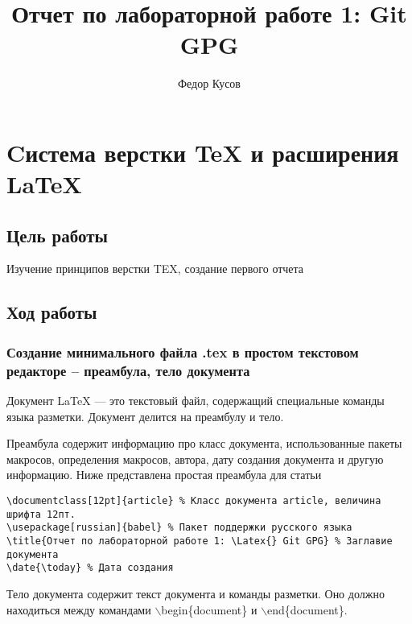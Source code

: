\documentclass[12pt,a4paper]{article}
\author{Федор Кусов}
\title{Отчет по лабораторной работе 1: \Latex{} Git GPG}
\begin{document}
\section{Cистема верстки \TeX{} и расширения \LaTeX{}}
\subsection{Цель работы}
Изучение принципов верстки TEX, создание первого отчета
\subsection{Ход работы}
\subsubsection{Создание минимального файла .tex в простом текстовом редакторе – преамбула, тело документа}


Документ LaTeX — это текстовый файл, содержащий специальные команды языка разметки. Документ делится на преамбулу и тело.

Преамбула содержит информацию про класс документа, использованные пакеты макросов, определения макросов, автора, дату создания документа и другую информацию. Ниже представлена простая преамбула для статьи
\begin{Verbatim}[xleftmargin=.5in,fontsize=\small]
\documentclass[12pt]{article} % Класс документа article, величина шрифта 12пт.
\usepackage[russian]{babel} % Пакет поддержки русского языка
\title{Отчет по лабораторной работе 1: \Latex{} Git GPG} % Заглавие документа
\date{\today} % Дата создания
\end{Verbatim}

Тело документа содержит текст документа и команды разметки. Оно должно находиться между командами $\backslash$begin\{document\} и $\backslash$end\{document\}.
\end{document}

